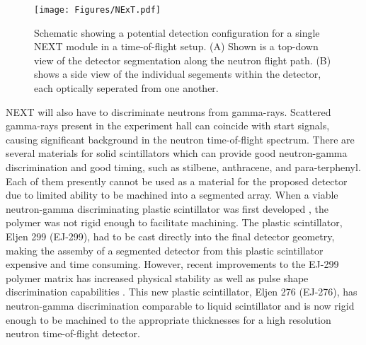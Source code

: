 \documentclass[preprint,3p,twocolumn]{elsarticle}
\begin{document}
\begin{figure}[tp]
  \centering
  \texttt{[image: Figures/NExT.pdf]}
  \caption{Schematic showing a potential detection configuration for a single NEXT module in a time-of-flight setup. (A) Shown is a top-down view of the detector segmentation along the neutron flight path. (B) shows a side view of the individual segements within the detector, each optically seperated from one another.}
  \label{fig:NEXTschematic}
\end{figure}
NEXT will also have to discriminate neutrons from gamma-rays. Scattered gamma-rays present in the experiment hall can coincide with start signals, causing significant background in the neutron time-of-flight spectrum.
There are several materials for solid scintillators which can provide good neutron-gamma discrimination and good timing, such as stilbene, anthracene, and para-terphenyl. Each of them presently cannot be used as a material for the proposed detector due to limited ability to be machined into a segmented array. When a viable neutron-gamma discriminating plastic scintillator was first developed \cite{Zaitseva2012}, the polymer was not rigid enough to facilitate machining. The plastic scintillator, Eljen 299 (EJ-299), had to be cast directly into the final detector geometry, making the assemby of a segmented detector from this plastic scintillator expensive and time consuming. However, recent improvements to the EJ-299 polymer matrix has increased physical stability as well as pulse shape discrimination capabilities \cite{ZAITSEVA201897}. This new plastic scintillator, Eljen 276 (EJ-276), has neutron-gamma discrimination comparable to liquid scintillator and is now rigid enough to be machined to the appropriate thicknesses for a high resolution neutron time-of-flight detector.
\end{document}
